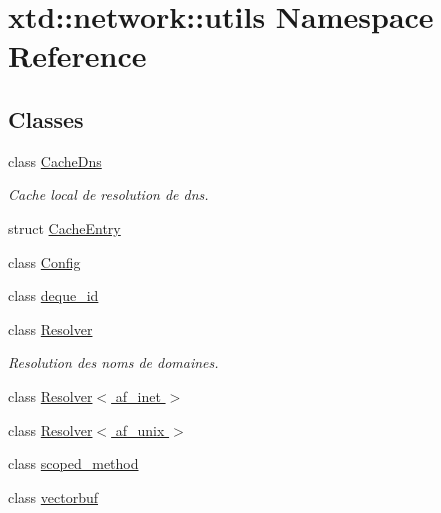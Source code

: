 \hypertarget{namespacextd_1_1network_1_1utils}{}\section{xtd\+:\+:network\+:\+:utils Namespace Reference}
\label{namespacextd_1_1network_1_1utils}
\subsection*{Classes}
\begin{DoxyCompactItemize}
\item 
class \hyperlink{classxtd_1_1network_1_1utils_1_1CacheDns}{Cache\+Dns}
\begin{DoxyCompactList}\small\item\em Cache local de resolution de dns. \end{DoxyCompactList}\item 
struct \hyperlink{structxtd_1_1network_1_1utils_1_1CacheEntry}{Cache\+Entry}
\item 
class \hyperlink{classxtd_1_1network_1_1utils_1_1Config}{Config}
\item 
class \hyperlink{classxtd_1_1network_1_1utils_1_1deque__id}{deque\+\_\+id}
\item 
class \hyperlink{classxtd_1_1network_1_1utils_1_1Resolver}{Resolver}
\begin{DoxyCompactList}\small\item\em Resolution des noms de domaines. \end{DoxyCompactList}\item 
class \hyperlink{classxtd_1_1network_1_1utils_1_1Resolver_3_01af__inet_01_4}{Resolver$<$ af\+\_\+inet $>$}
\item 
class \hyperlink{classxtd_1_1network_1_1utils_1_1Resolver_3_01af__unix_01_4}{Resolver$<$ af\+\_\+unix $>$}
\item 
class \hyperlink{classxtd_1_1network_1_1utils_1_1scoped__method}{scoped\+\_\+method}
\item 
class \hyperlink{classxtd_1_1network_1_1utils_1_1vectorbuf}{vectorbuf}
\end{DoxyCompactItemize}
